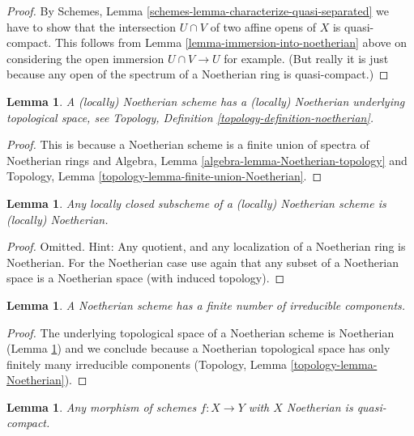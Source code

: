 \documentclass{stacks-project}
\theoremstyle{plain}
\newtheorem{lemma}[subsection]{Lemma}
\theoremstyle{definition}
\theoremstyle{remark}
\numberwithin{equation}{subsection}
\begin{document}
\begin{proof}
By Schemes, Lemma \ref{schemes-lemma-characterize-quasi-separated}
we have to show that the intersection $U \cap V$ of two
affine opens of $X$ is quasi-compact. This follows from
Lemma \ref{lemma-immersion-into-noetherian} above on
considering the open immersion $U \cap V \to U$ for example.
(But really it is just because any open of the spectrum of a
Noetherian ring is quasi-compact.)
\end{proof}

\begin{lemma}
\label{lemma-Noetherian-topology}
A (locally) Noetherian scheme has a (locally)
Noetherian underlying topological space,
see Topology, Definition \ref{topology-definition-noetherian}.
\end{lemma}

\begin{proof}
This is because a Noetherian scheme is a finite union of spectra
of Noetherian rings and
Algebra, Lemma \ref{algebra-lemma-Noetherian-topology} and
Topology, Lemma \ref{topology-lemma-finite-union-Noetherian}.
\end{proof}

\begin{lemma}
\label{lemma-locally-closed-in-Noetherian}
Any locally closed subscheme of a (locally) Noetherian
scheme is (locally) Noetherian.
\end{lemma}

\begin{proof}
Omitted. Hint: Any quotient, and any localization of a Noetherian
ring is Noetherian. For the Noetherian case use again
that any subset of a Noetherian space is a Noetherian space
(with induced topology).
\end{proof}

\begin{lemma}
\label{lemma-Noetherian-irreducible-components}
A Noetherian scheme has a finite number of irreducible components.
\end{lemma}

\begin{proof}
The underlying topological space of a Noetherian scheme is Noetherian
(Lemma \ref{lemma-Noetherian-topology})
and we conclude because a Noetherian topological space
has only finitely many irreducible components
(Topology, Lemma \ref{topology-lemma-Noetherian}).
\end{proof}

\begin{lemma}
\label{lemma-morphism-Noetherian-schemes-quasi-compact}
Any morphism of schemes $f : X \to Y$ with $X$ Noetherian
is quasi-compact.
\end{lemma}
\end{document}
